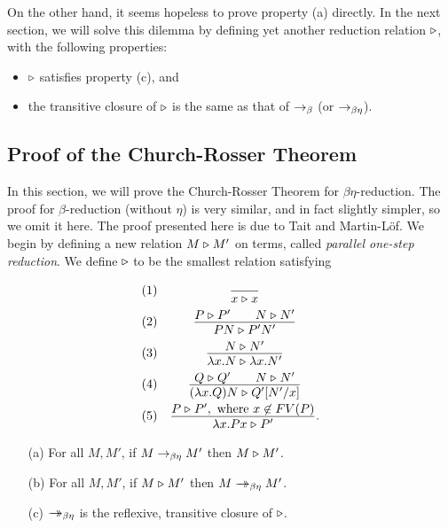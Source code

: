 \documentclass{article}
\begin{document}
On the other hand, it seems hopeless to prove property (a) directly.
In the next section, we will solve this dilemma by defining yet
another reduction relation $\mathrel{\triangleright}$, with the following properties:
\begin{itemize}
\item $\mathrel{\triangleright}$ satisfies property (c), and
\item the transitive closure of $\mathrel{\triangleright}$ is the same as that of $\rightarrow_{\beta}$
  (or $\rightarrow_{\beta\eta}$).
\end{itemize}

\subsection{Proof of the Church-Rosser Theorem}
\label{subsec-proof-cr}

In this section, we will prove the Church-Rosser Theorem for
$\beta\eta$-reduction. The proof for $\beta$-reduction (without
$\eta$) is very similar, and in fact slightly simpler, so we omit it
here. The proof presented here is due to Tait and Martin-L\"of. We
begin by defining a new relation $M\mathrel{\triangleright} M'$ on terms, called {\em
 parallel one-step reduction}. We define $\mathrel{\triangleright}$ to be the smallest
relation satisfying
\[ \begin{array}{lc}
  (1) & \deriv{}{x\tri x} \nl
  (2) & \deriv{P \tri P' \sep N \tri N'}{PN \tri P'N'} \nl
  (3) & \deriv{N \tri N'}{\lam x.N \tri \lam x.N'} \nl
  (4) & \deriv{Q \tri Q' \sep N \tri N'}{(\lam x.Q)N \tri \subst{Q'}{N'}{x}}
  \nl
  (5) & \deriv{P \tri P',\mbox{ where $x\not\in\FV{P}$}}{\lam x.Px
    \tri P'}.
\end{array}
\]

\begin{lemma}\label{lem-tri-redbes}
  \begin{enumerate}
  \item[(a)] For all $M,M'$, if $M\rightarrow_{\beta\eta} M'$ then $M\mathrel{\triangleright} M'$.
  \item[(b)] For all $M,M'$, if $M\mathrel{\triangleright} M'$ then $M\mathrel{\rightarrow\!\!\!\!\!\rightarrow}_{\beta\eta} M'$.
  \item[(c)] $\mathrel{\rightarrow\!\!\!\!\!\rightarrow}_{\beta\eta}$ is the reflexive, transitive closure of $\mathrel{\triangleright}$.
  \end{enumerate}
\end{lemma}
\end{document}
